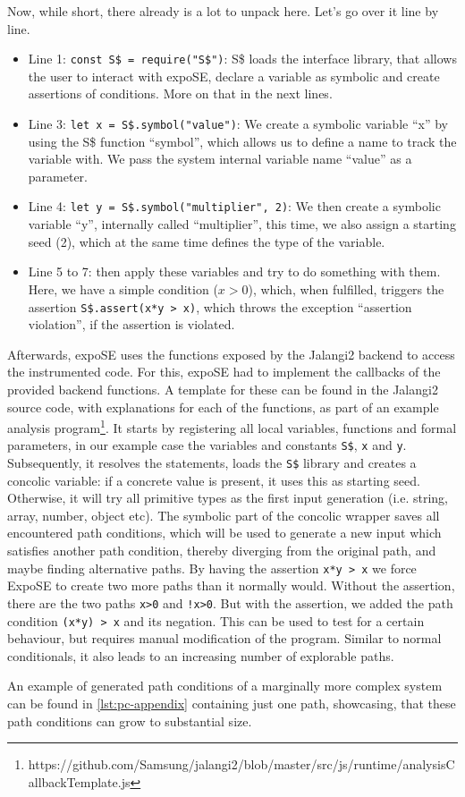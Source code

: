 Now, while short, there already is a lot to unpack here. Let's go over it line by line. 
\begin{itemize}
    \item Line 1: \lstinline{const S$ = require("S$")}: S\$ loads the interface library, that allows the user to interact with expoSE, declare a variable as symbolic and create assertions of conditions. More on that in the next lines.
    \item Line 3: \lstinline{let x = S$.symbol("value")}: We create a symbolic variable “x” by using the S\$ function “symbol”, which allows us to define a name to track the variable with. We pass the system internal variable name “value” as a parameter.  
    \item Line 4: \lstinline{let y = S$.symbol("multiplier", 2)}: We then create a symbolic variable “y”, internally called “multiplier”, this time, we also assign a starting seed (2), which at the same time defines the type of the variable.
    \item Line 5 to 7: then apply these variables and try to do something with them. Here, we have a simple condition ($x > 0$), which, when fulfilled, triggers the assertion \lstinline{S$.assert(x*y > x)}, which throws the exception “assertion violation”, if  the assertion is violated.
\end{itemize}
Afterwards, expoSE uses the functions exposed by the Jalangi2 backend  to access the instrumented code. For this, expoSE had to implement the callbacks of the provided backend functions. A template for these can be found in the Jalangi2 source code, with explanations for each of the functions, as part of an example analysis program\footnote{https://github.com/Samsung/jalangi2/blob/master/src/js/runtime/analysisCallbackTemplate.js}. 
It starts by registering all local variables, functions and formal parameters, in our example case the variables and constants \lstinline{S$}, \lstinline{x} and \lstinline{y}. Subsequently, it resolves the statements, loads the \lstinline{S$} library and creates a concolic variable: if a concrete value is present, it uses this as starting seed. Otherwise, it will try all primitive types as the first input generation (i.e. string, array, number, object etc). The symbolic part of the concolic wrapper saves all encountered path conditions, which will be used to generate a new input which satisfies another path condition, thereby diverging from the original path, and maybe finding alternative paths.
By having the assertion \lstinline{x*y > x} we force ExpoSE to create two more paths than it normally would. Without the assertion, there are the two paths \lstinline{x>0} and \lstinline{!x>0}. But with the assertion, we added the path condition \lstinline{(x*y) > x} and its negation. This can be used to test for a certain behaviour, but requires manual modification of the program. Similar to normal conditionals, it also leads to an increasing number of explorable paths.

An example of generated path conditions of a marginally more complex system can be found in \autoref{lst:pc-appendix} containing just one path, showcasing, that these path conditions can grow to substantial size.


